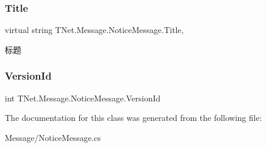 \subsubsection{\texorpdfstring{Title}{Title}}
{\footnotesize\ttfamily virtual string T\+Net.\+Message.\+Notice\+Message.\+Title\hspace{0.3cm}{\ttfamily [get]}, {\ttfamily [set]}}



标题 

\mbox{\label{class_t_net_1_1_message_1_1_notice_message_a148940cbeaf7018e0d2ab58460b6a678}} 
\subsubsection{\texorpdfstring{Version\+Id}{VersionId}}
{\footnotesize\ttfamily int T\+Net.\+Message.\+Notice\+Message.\+Version\+Id\hspace{0.3cm}{\ttfamily [get]}}







The documentation for this class was generated from the following file\+:\begin{DoxyCompactItemize}
\item 
Message/Notice\+Message.\+cs\end{DoxyCompactItemize}
